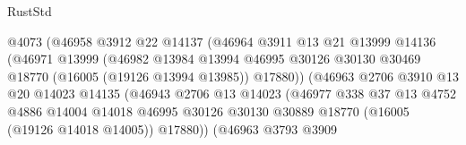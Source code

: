 \begin{lexlean}{RustStd}
\begin{coremodule}
                                    @4073
                                    (@46958
                                      @3912
                                      @22
                                      @14137
                                      (@46964
                                        @3911
                                        @13
                                        @21
                                        @13999
                                        @14136
                                        (@46971
                                          @13999
                                          (@46982
                                            @13984
                                            @13994
                                            @46995
                                            @30126
                                            @30130
                                            @30469
                                            @18770
                                            (@16005 (@19126 @13994 @13985))
                                            @17880))
                                        (@46963
                                          @2706
                                          @3910
                                          @13
                                          @20
                                          @14023
                                          @14135
                                          (@46943
                                            @2706
                                            @13
                                            @14023
                                            (@46977
                                              @338
                                              @37
                                              @13
                                              @4752
                                              @4886
                                              @14004
                                              @14018
                                              @46995
                                              @30126
                                              @30130
                                              @30889
                                              @18770
                                              (@16005 (@19126 @14018 @14005))
                                              @17880))
                                          (@46963
                                            @3793
                                            @3909

\end{coremodule}
\end{lexlean}
